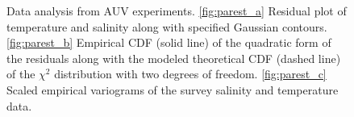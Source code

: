 \documentclass[aoas]{imsart}
\begin{document}
\begin{figure}[!b]
  \centering
  \hfill
  \hfill
  \caption{Data analysis from AUV experiments. \ref{fig:parest_a} Residual plot of temperature and salinity
    along with specified Gaussian contours. \ref{fig:parest_b} Empirical CDF
    (solid line) of the quadratic form of the residuals along with the
    modeled theoretical CDF (dashed line) of the $\chi^2$ distribution with two
    degrees of freedom. \ref{fig:parest_c} Scaled empirical variograms of the survey
    salinity and temperature data.}
\label{fig:parest}
\end{figure}
\end{document}

